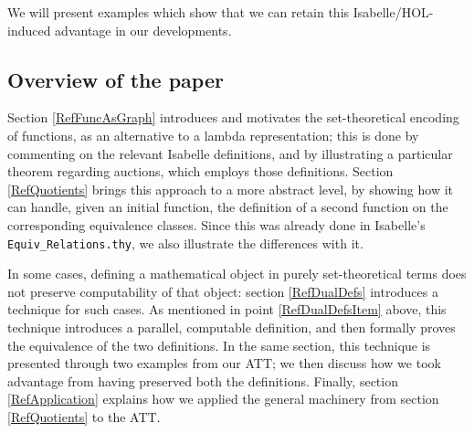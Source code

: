\documentclass[
]{llncs}
\newcommand{\att}{ATT}
\newcommand{\I}{Isabelle}
\begin{document}
We will present examples which show that we can retain this \I{}/HOL-induced advantage in our developments.


\subsection*{Overview of the paper}
Section \ref{RefFuncAsGraph} introduces and motivates the set-theoretical encoding of functions, as an alternative to a lambda representation; this is done by commenting on the relevant \I{} definitions, and by illustrating a particular theorem regarding auctions, which employs those definitions.
Section \ref{RefQuotients} brings this approach to a more abstract level, by showing how it can handle, given an initial function, the definition of a second function on the corresponding equivalence classes. Since this was already done in \I{}'s \verb|Equiv_Relations.thy|, we also illustrate the differences with it.

In some cases, defining a mathematical object in purely set-theoretical terms does not preserve computability of that object: section \ref{RefDualDefs} introduces a technique for such cases.
As mentioned in point \ref{RefDualDefsItem} above, this technique introduces a parallel, computable definition, and then formally proves the equivalence of the two definitions.
In the same section, this technique is presented through two examples from our \att{}; we then discuss how we took advantage from having preserved both the definitions.
Finally, section \ref{RefApplication} explains how we applied the general machinery from section \ref{RefQuotients} to the \att{}.
\end{document}
